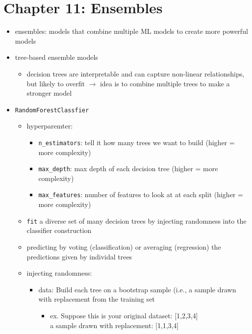 \documentclass[10.5pt,a4paper, fleqn, dvipsnames]{article}
\makeatletter
\newcommand*{\sectionbookmark}[1][]{%
  \bookmark[%
    level=section,%
    dest=\@currentHref,%
    #1%
  ]%
}
\makeatother
\begin{document}
\section*{Chapter 11: Ensembles}
\sectionbookmark{Chapter 11: Ensembles}
\begin{itemize}
    \item ensembles: models that combine multiple ML models to create more powerful models 
    \item tree-based ensemble models 
    \begin{itemize}
        \item decision trees are interpretable and can capture non-linear relationships, but likely to overfit $\rightarrow$ idea is to combine multiple trees to make a stronger model 
    \end{itemize}
    \item \lstinline{RandomForestClassfier}
    \begin{itemize}
        \item hyperparemter:
        \begin{itemize}[leftmargin = 2em]
            \item \lstinline{n_estimators}: tell it how many trees we want to build (higher = more complexity)
            \item \lstinline{max_depth}: max depth of each decision tree (higher = more complexity)
            \item \lstinline{max_features}: number of features to look at at each split (higher = more complexity)
        \end{itemize}
        \item \lstinline{fit} a diverse set of many decision trees by injecting randomness into the classifier construction 
        \item predicting by voting (classification) or averaging (regression) the predictions given by individal trees 
        \item injecting randomness:
        \begin{itemize}[leftmargin = 2em ]
            \item data: Build each tree on a bootstrap sample (i.e., a sample drawn with replacement from the training set
            \begin{itemize}
                \item ex. Suppose this is your original dataset: [1,2,3,4]\\
                a sample drawn with replacement: [1,1,3,4]\\

\end{itemize}
\end{itemize}
\end{itemize}
\end{itemize}
\end{document}

